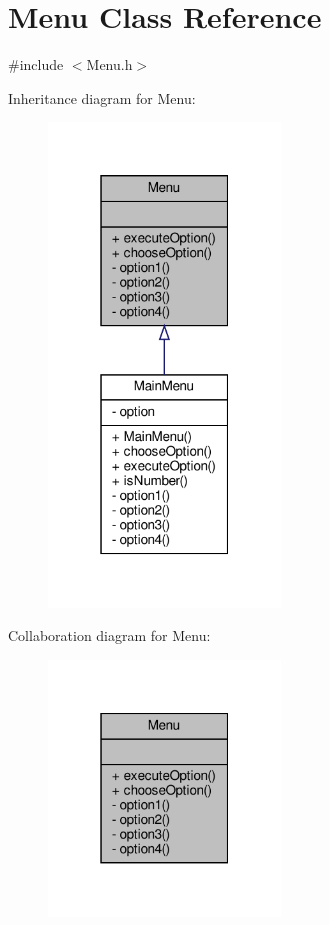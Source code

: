\hypertarget{classMenu}{}\section{Menu Class Reference}
\label{classMenu}


{\ttfamily \#include $<$Menu.\+h$>$}



Inheritance diagram for Menu\+:
\nopagebreak
\begin{figure}[H]
\begin{center}
\leavevmode
\includegraphics[width=175pt]{classMenu__inherit__graph}
\end{center}
\end{figure}


Collaboration diagram for Menu\+:
\nopagebreak
\begin{figure}[H]
\begin{center}
\leavevmode
\includegraphics[width=175pt]{classMenu__coll__graph}
\end{center}
\end{figure}
